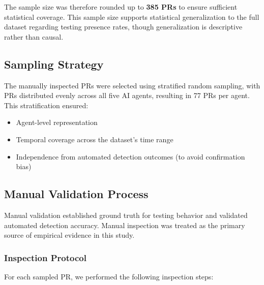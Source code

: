 \documentclass[conference]{IEEEtran}
\begin{document}
The sample size was therefore rounded up to \textbf{385 PRs} to ensure sufficient statistical coverage. This sample size supports statistical generalization to the full dataset regarding testing presence rates, though generalization is descriptive rather than causal.

\subsection{Sampling Strategy}

The manually inspected PRs were selected using stratified random sampling, with PRs distributed evenly across all five AI agents, resulting in 77 PRs per agent. This stratification ensured:
\begin{itemize}
    \item Agent-level representation
    \item Temporal coverage across the dataset's time range
    \item Independence from automated detection outcomes (to avoid confirmation bias)
\end{itemize}

\subsection{Manual Validation Process}
\label{sec:manual}

Manual validation established ground truth for testing behavior and validated automated detection accuracy. Manual inspection was treated as the primary source of empirical evidence in this study.

\subsubsection{Inspection Protocol}

For each sampled PR, we performed the following inspection steps:
\end{document}
